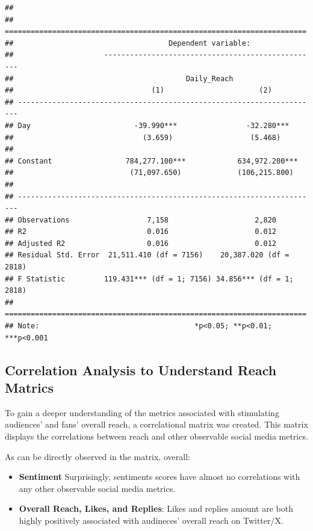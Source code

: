 \documentclass[
]{book}
\begin{document}
\begin{verbatim}
## 
## ======================================================================
##                                    Dependent variable:                
##                     --------------------------------------------------
##                                        Daily_Reach                    
##                                (1)                      (2)           
## ----------------------------------------------------------------------
## Day                        -39.990***                -32.280***       
##                              (3.659)                  (5.468)         
##                                                                       
## Constant                 784,277.100***            634,972.200***     
##                           (71,097.650)             (106,215.800)      
##                                                                       
## ----------------------------------------------------------------------
## Observations                  7,158                    2,820          
## R2                            0.016                    0.012          
## Adjusted R2                   0.016                    0.012          
## Residual Std. Error  21,511.410 (df = 7156)    20,387.020 (df = 2818) 
## F Statistic         119.431*** (df = 1; 7156) 34.856*** (df = 1; 2818)
## ======================================================================
## Note:                                    *p<0.05; **p<0.01; ***p<0.001
\end{verbatim}

\hypertarget{correlation-analysis-to-understand-reach-matrics}{%
\subsection{Correlation Analysis to Understand Reach Matrics}\label{correlation-analysis-to-understand-reach-matrics}}

To gain a deeper understanding of the metrics associated with stimulating audiences' and fans' overall reach, a correlational matrix was created. This matrix displays the correlations between reach and other observable social media metrics.

As can be directly observed in the matrix, overall:

\begin{itemize}
\item
  \textbf{Sentiment} Surprisingly, sentiments scores have almost no correlations with any other observable social media metrics.
\item
  \textbf{Overall Reach, Likes, and Replies}: Likes and replies amount are both highly positively associated with audineces' overall reach on Twitter/X.
\end{itemize}
\end{document}
